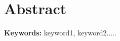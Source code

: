 
\chapter*{Abstract}
  
  
    
\par
\vspace{0.5in}    
    
\noindent
{\bf Keywords:} keyword1, keyword2.....



  